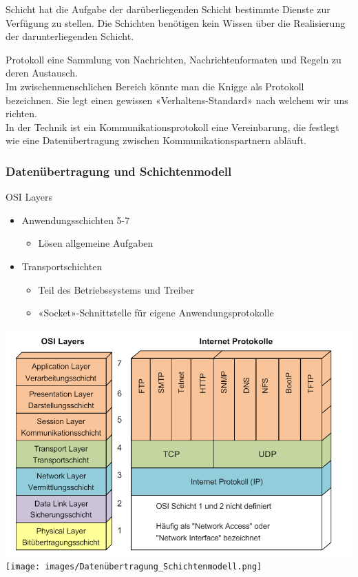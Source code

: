 \begin{definition}{Schicht}
    hat die Aufgabe der darüberliegenden Schicht bestimmte Dienste zur Verfügung zu stellen. Die Schichten benötigen kein Wissen über die Realisierung der darunterliegenden Schicht.
\end{definition}

\begin{definition}{Protokoll}
     eine Sammlung von Nachrichten, Nachrichtenformaten und Regeln zu deren Austausch.\\
     Im zwischenmenschlichen Bereich könnte man die Knigge als Protokoll bezeichnen. Sie legt einen gewissen «Verhaltens-Standard» nach welchem wir uns richten. \\
     In der Technik ist ein Kommunikationsprotokoll eine Vereinbarung, die festlegt wie eine Datenübertragung zwischen Kommunikationspartnern abläuft.
\end{definition}

\subsubsection{Datenübertragung und Schichtenmodell}

\begin{definition}{OSI Layers}
    \begin{itemize}
        \item Anwendungsschichten 5-7
        \begin{itemize}
            \item Lösen allgemeine Aufgaben
        \end{itemize}
        \item Transportschichten
        \begin{itemize}
            \item Teil des Betriebssystems und Treiber
            \item «Socket»-Schnittstelle für eigene Anwendungsprotokolle
        \end{itemize}
    \end{itemize}
\end{definition}

\includegraphics[width=0.9\linewidth]{images/OSI_Modell.png}
\texttt{[image: images/Datenübertragung\_Schichtenmodell.png]}

